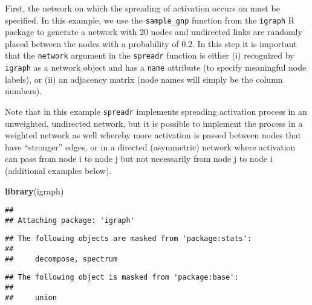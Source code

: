 \documentclass[]{article}
\newenvironment{Shaded}{\begin{snugshade}}{\end{snugshade}}
\newcommand{\KeywordTok}[1]{\textcolor[rgb]{0.13,0.29,0.53}{\textbf{#1}}}
\newcommand{\NormalTok}[1]{#1}
\begin{document}
First, the network on which the spreading of activation occurs on must
be specified. In this example, we use the \texttt{sample\_gnp} function
from the \texttt{igraph} R package to generate a network with 20 nodes
and undirected links are randomly placed between the nodes with a
probability of 0.2. In this step it is important that the
\texttt{network} argument in the \texttt{spreadr} function is either (i)
recognized by \texttt{igraph} as a network object and has a
\texttt{name} attribute (to specify meaningful node labels), or (ii) an
adjacency matrix (node names will simply be the column numbers).

Note that in this example \texttt{spreadr} implements spreading
activation process in an unweighted, undirected network, but it is
possible to implement the process in a weighted network as well whereby
more activation is passed between nodes that have ``stronger'' edges, or
in a directed (asymmetric) network where activation can pass from node i
to node j but not necessarily from node j to node i (additional examples
below).

\begin{Shaded}
\begin{Highlighting}[]
\KeywordTok{library}\NormalTok{(igraph)}
\end{Highlighting}
\end{Shaded}

\begin{verbatim}
## 
## Attaching package: 'igraph'
\end{verbatim}

\begin{verbatim}
## The following objects are masked from 'package:stats':
## 
##     decompose, spectrum
\end{verbatim}

\begin{verbatim}
## The following object is masked from 'package:base':
## 
##     union
\end{verbatim}
\end{document}
